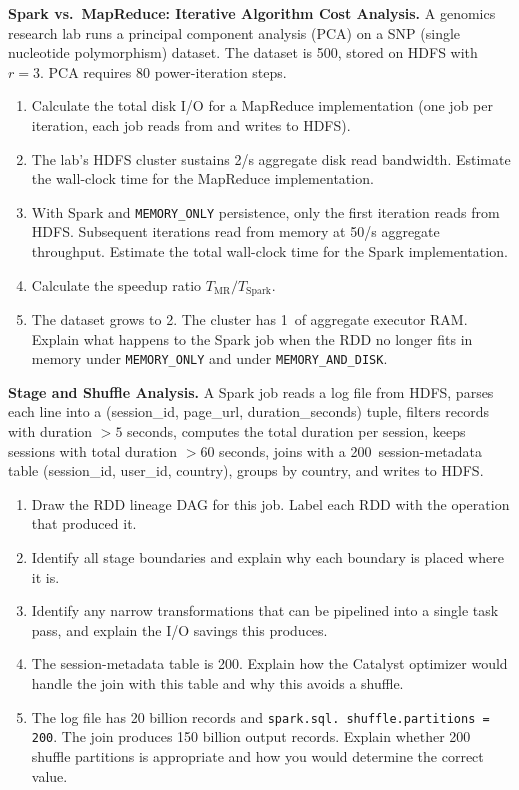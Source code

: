 \ap \textbf{Spark vs.\ MapReduce: Iterative Algorithm Cost Analysis.}
A genomics research lab runs a principal component analysis (PCA) on a
SNP (single nucleotide polymorphism) dataset. The dataset is 500\GB,
stored on HDFS with $r = 3$. PCA requires 80 power-iteration steps.

\begin{enumerate}[label=(\alph*)]
  \item Calculate the total disk I/O for a MapReduce implementation
        (one job per iteration, each job reads from and writes to HDFS).
  \item The lab's HDFS cluster sustains 2\GB/s aggregate disk read
        bandwidth. Estimate the wall-clock time for the MapReduce
        implementation.
  \item With Spark and \texttt{MEMORY\_ONLY} persistence, only the
        first iteration reads from HDFS. Subsequent iterations read
        from memory at 50\GB/s aggregate throughput. Estimate the total
        wall-clock time for the Spark implementation.
  \item Calculate the speedup ratio $T_{\text{MR}} / T_{\text{Spark}}$.
  \item The dataset grows to 2\TB. The cluster has 1\TB\ of aggregate
        executor RAM. Explain what happens to the Spark job when the RDD
        no longer fits in memory under \texttt{MEMORY\_ONLY} and under
        \texttt{MEMORY\_AND\_DISK}.
\end{enumerate}

\ap \textbf{Stage and Shuffle Analysis.}
A Spark job reads a log file from HDFS, parses each line into a
(session\_id, page\_url, duration\_seconds) tuple, filters records with
duration $> 5$ seconds, computes the total duration per session, keeps
sessions with total duration $> 60$ seconds, joins with a 200\MB\
session-metadata table (session\_id, user\_id, country), groups by
country, and writes to HDFS.

\begin{enumerate}[label=(\alph*)]
  \item Draw the RDD lineage DAG for this job. Label each RDD with the
        operation that produced it.
  \item Identify all stage boundaries and explain why each boundary
        is placed where it is.
  \item Identify any narrow transformations that can be pipelined into
        a single task pass, and explain the I/O savings this produces.
  \item The session-metadata table is 200\MB. Explain how the Catalyst
        optimizer would handle the join with this table and why this
        avoids a shuffle.
  \item The log file has 20 billion records and \texttt{spark.sql.
        shuffle.partitions = 200}. The join produces 150 billion
        output records. Explain whether 200 shuffle partitions is
        appropriate and how you would determine the correct value.
\end{enumerate}

